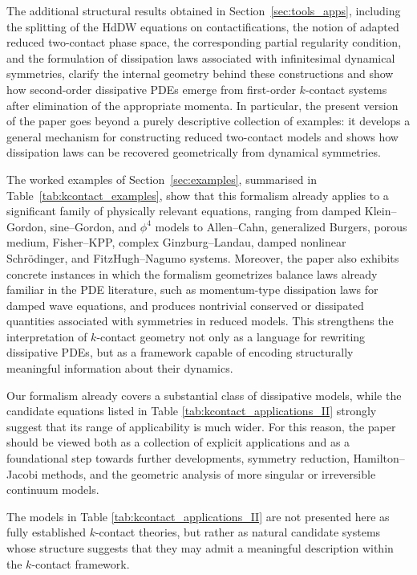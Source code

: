 \documentclass[11pt,a4paper]{article}
\theoremstyle{plain} \newtheorem{theorem}{Theorem}[section] \newtheorem{proposition}[theorem]{Proposition} \newtheorem{corollary}[theorem]{Corollary} \newtheorem{lemma}[theorem]{Lemma} \theoremstyle{definition} \newtheorem{definition}[theorem]{Definition} \theoremstyle{remark} \newtheorem{remark}[theorem]{Remark} \newtheorem{example}[theorem]{Example} %
\begin{document}
The additional structural results obtained in Section~\ref{sec:tools_apps}, including the splitting of the HdDW equations on contactifications, the notion of adapted reduced two-contact phase space, the corresponding partial regularity condition, and the formulation of dissipation laws associated with infinitesimal dynamical symmetries, clarify the internal geometry behind these constructions and show how second-order dissipative PDEs emerge from first-order \(k\)-contact systems after elimination of the appropriate momenta. In particular, the present version of the paper goes beyond a purely descriptive collection of examples: it develops a general mechanism for constructing reduced two-contact models and shows how dissipation laws can be recovered geometrically from dynamical symmetries.

The worked examples of Section~\ref{sec:examples}, summarised in Table~\ref{tab:kcontact_examples}, show that this formalism already applies to a significant family of physically relevant equations, ranging from damped Klein--Gordon, sine--Gordon, and \(\phi^4\) models to Allen--Cahn, generalized Burgers, porous medium, Fisher--KPP, complex Ginzburg--Landau, damped nonlinear Schr\"odinger, and FitzHugh--Nagumo systems. Moreover, the paper also exhibits concrete instances in which the formalism geometrizes balance laws already familiar in the PDE literature, such as momentum-type dissipation laws for damped wave equations, and produces nontrivial conserved or dissipated quantities associated with symmetries in reduced models. This strengthens the interpretation of \(k\)-contact geometry not only as a language for rewriting dissipative PDEs, but as a framework capable of encoding structurally meaningful information about their dynamics.

Our formalism already covers a substantial class of dissipative models, while the candidate equations listed in Table \ref{tab:kcontact_applications_II} strongly suggest that its range of applicability is much wider. For this reason, the paper should be viewed both as a collection of explicit applications and as a foundational step towards further developments, symmetry reduction, Hamilton--Jacobi methods, and the geometric analysis of more singular or irreversible continuum models.


The models in Table  \ref{tab:kcontact_applications_II} are not presented here as fully established $k$-contact theories, but rather as natural candidate systems whose structure suggests that they may admit a meaningful description within the $k$-contact framework.
\end{document}
